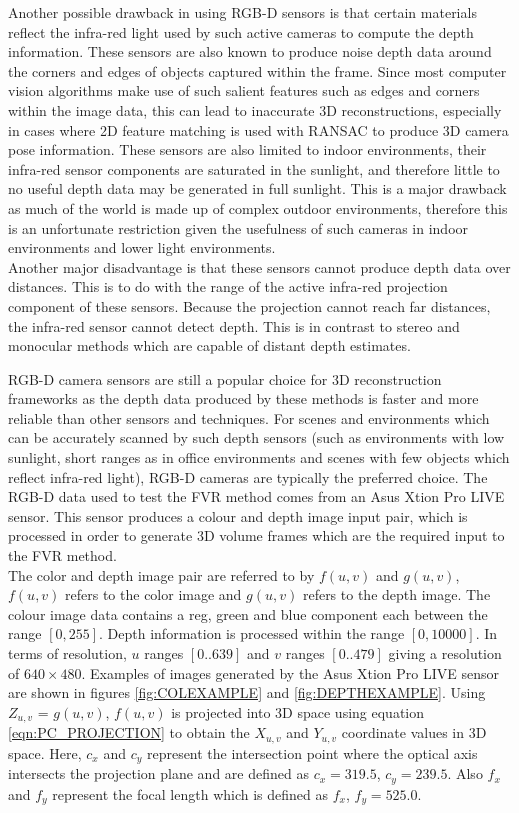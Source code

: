 Another possible drawback in using RGB-D sensors is that certain materials reflect the infra-red light used by such active cameras to compute the depth information. These sensors are also known to produce noise depth data around the corners and edges of objects captured within the frame. Since most computer vision algorithms make use of such salient features such as edges and corners within the image data, this can lead to inaccurate 3D reconstructions, especially in cases where 2D feature matching is used with RANSAC to produce 3D camera pose information. These sensors are also limited to indoor environments, their infra-red sensor components are saturated in the sunlight, and therefore little to no useful depth data may be generated in full sunlight. This is a major drawback as much of the world is made up of complex outdoor environments, therefore this is an unfortunate restriction given the usefulness of such cameras in indoor environments and lower light environments. \\

Another major disadvantage is that these sensors cannot produce depth data over distances. This is to do with the range of the active infra-red projection component of these sensors. Because the projection cannot reach far distances, the infra-red sensor cannot detect depth. This is in contrast to stereo and monocular methods which are capable of distant depth estimates.  

RGB-D camera sensors are still a popular choice for 3D reconstruction frameworks as the depth data produced by these methods is faster and more reliable than other sensors and techniques. For scenes and environments which can be accurately scanned by such depth sensors (such as environments with low sunlight, short ranges as in office environments and scenes with few objects which reflect infra-red light), RGB-D cameras are typically the preferred choice. The RGB-D data used to test the FVR method comes from an Asus Xtion Pro LIVE sensor. This sensor produces a colour and depth image input pair, which is processed in order to generate 3D volume frames which are the required input to the FVR method. \\

The color and depth image pair are referred to by $f(u,v)$ and $g(u,v)$, $f(u,v)$ refers to the color image and $g(u,v)$ refers to the depth image. The colour image data contains a reg, green and blue component each between the range $[0,255]$. Depth information is processed within the range $[0,10000]$. In terms of resolution, $u$ ranges $[0..639]$ and $v$ ranges $[0..479]$ giving a resolution of $640 \times 480$. Examples of images generated by the Asus Xtion Pro LIVE sensor are shown in figures \ref{fig:COLEXAMPLE} and \ref{fig:DEPTHEXAMPLE}. Using $Z_{u,v}$ = $g(u,v)$, $f(u,v)$ is projected into 3D space using equation \ref{eqn:PC_PROJECTION} to obtain the $X_{u,v}$ and $Y_{u,v}$ coordinate values in 3D space. Here, $c_x$ and $c_y$ represent the intersection point where the optical axis intersects the projection plane and are defined as $c_x = 319.5$, $c_y = 239.5$. Also $f_x$ and $f_y$ represent the focal length which is defined as $f_x$, $f_y = 525.0$. \\


